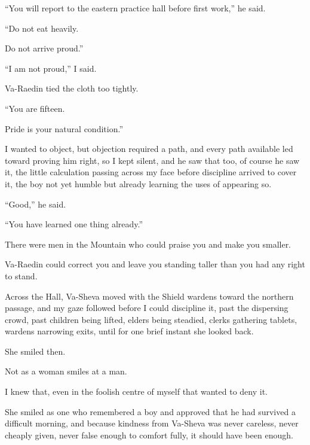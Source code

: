 “You will report to the eastern practice hall before first work,” he said.\par

“Do not eat heavily.\par

Do not arrive proud.”\par

“I am not proud,” I said.\par

Va-Raedin tied the cloth too tightly.\par

“You are fifteen.\par

Pride is your natural condition.”\par

I wanted to object, but objection required a path, and every path available led toward proving him right, so I kept silent, and he saw that too, of course he saw it, the little calculation passing across my face before discipline arrived to cover it, the boy not yet humble but already learning the uses of appearing so.\par

“Good,” he said.\par

“You have learned one thing already.”\par

There were men in the Mountain who could praise you and make you smaller.\par

Va-Raedin could correct you and leave you standing taller than you had any right to stand.\par

Across the Hall, Va-Sheva moved with the Shield wardens toward the northern passage, and my gaze followed before I could discipline it, past the dispersing crowd, past children being lifted, elders being steadied, clerks gathering tablets, wardens narrowing exits, until for one brief instant she looked back.\par

She smiled then.\par

Not as a woman smiles at a man.\par

I knew that, even in the foolish centre of myself that wanted to deny it.\par

She smiled as one who remembered a boy and approved that he had survived a difficult morning, and because kindness from Va-Sheva was never careless, never cheaply given, never false enough to comfort fully, it should have been enough.\par

